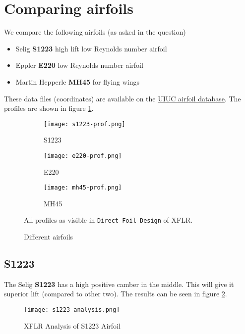 \section{Comparing airfoils}

We compare the following airfoils (as asked in the question)

\begin{itemize}
    \item Selig \textbf{S1223} high lift low Reynolds number airfoil
    \item Eppler \textbf{E220} low Reynolds number airfoil
    \item Martin Hepperle \textbf{MH45} for flying wings
\end{itemize}

These data files (coordinates) are available on the \href{https://m-selig.ae.illinois.edu/ads/coord_database.html}{UIUC airfoil database}. The profiles are shown in figure \ref{fig:q2-diff-airfoils}.

\begin{figure}[ht]
    \centering
    \begin{subfigure}[b]{0.3\textwidth}
        \texttt{[image: s1223-prof.png]}
        \caption{S1223}
    \end{subfigure}
    \begin{subfigure}[b]{0.3\textwidth}
        \texttt{[image: e220-prof.png]}
        \caption{E220}
    \end{subfigure}
    \begin{subfigure}[b]{0.3\textwidth}
        \texttt{[image: mh45-prof.png]}
        \caption{MH45}
    \end{subfigure}
    \caption{Different airfoils}
    \label{fig:q2-diff-airfoils}
    \small
        All profiles as visible in \texttt{Direct Foil Design} of XFLR.
\end{figure}

\subsection{S1223}

The Selig \textbf{S1223} has a high positive camber in the middle. This will give it superior lift (compared to other two). The results can be seen in figure \ref{fig:s1223-analysis}.

\begin{figure}[ht]
    \centering
    \texttt{[image: s1223-analysis.png]}
    \caption{XFLR Analysis of S1223 Airfoil}
    \label{fig:s1223-analysis}
\end{figure}

